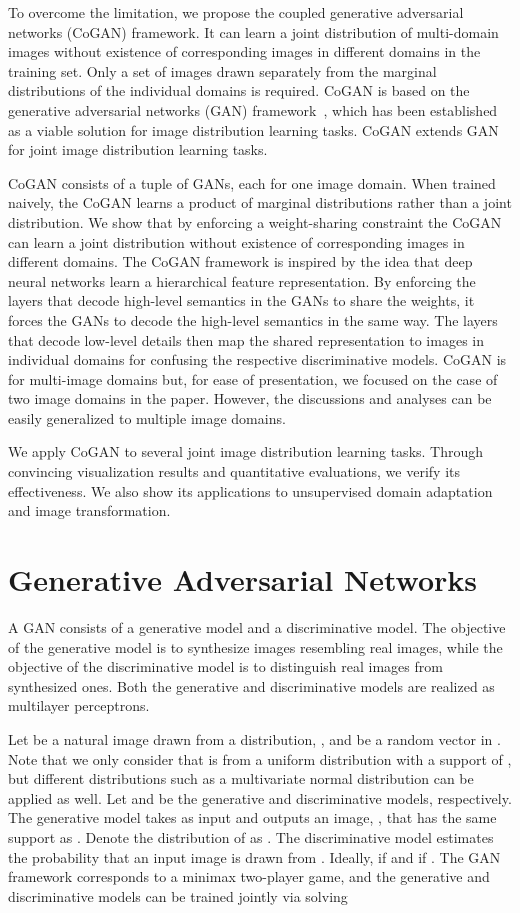\documentclass{article}
\begin{document}
To overcome the limitation, we propose the coupled generative adversarial networks (CoGAN) framework. It can learn a joint distribution of multi-domain images without existence of corresponding images in different domains in the training set. Only a set of images drawn separately from the marginal distributions of the individual domains is required. CoGAN is based on the generative adversarial networks (GAN) framework~\cite{goodfellow2014generative}, which has been established as a viable solution for image distribution learning tasks. CoGAN extends GAN for joint image distribution learning tasks.

CoGAN consists of a tuple of GANs, each for one image domain. When trained naively, the CoGAN learns a product of marginal distributions rather than a joint distribution. We show that by enforcing a weight-sharing constraint the CoGAN can learn a joint distribution without existence of corresponding images in different domains. The CoGAN framework is inspired by the idea that deep neural networks learn a hierarchical feature representation. By enforcing the layers that decode high-level semantics in the GANs to share the weights, it forces the GANs to decode the high-level semantics in the same way. The layers that decode low-level details then map the shared representation to images in individual domains for confusing the respective discriminative models. CoGAN is for multi-image domains but, for ease of presentation, we focused on the case of two image domains in the paper. However, the discussions and analyses can be easily generalized to multiple image domains.

We apply CoGAN to several joint image distribution learning tasks. Through convincing visualization results and quantitative evaluations, we verify its effectiveness. We also show its applications to unsupervised domain adaptation and image transformation. \section{Generative Adversarial Networks}\label{sec::gan}

A GAN consists of a generative model and a discriminative model. The objective of the generative model is to synthesize images resembling real images, while the objective of the discriminative model is to distinguish real images from synthesized ones. Both the generative and discriminative models are realized as multilayer perceptrons. 

Let  be a natural image drawn from a distribution, , and  be a random vector in . Note that we only consider that  is from a uniform distribution with a support of , but different distributions such as a multivariate normal distribution can be applied as well. Let  and  be the generative and discriminative models, respectively. The generative model takes  as input and outputs an image, , that has the same support as . Denote the distribution of  as . The discriminative model estimates the probability that an input image is drawn from . Ideally,  if  and  if . The GAN framework corresponds to a minimax two-player game, and the generative and discriminative models can be trained jointly via solving 
\end{document}
